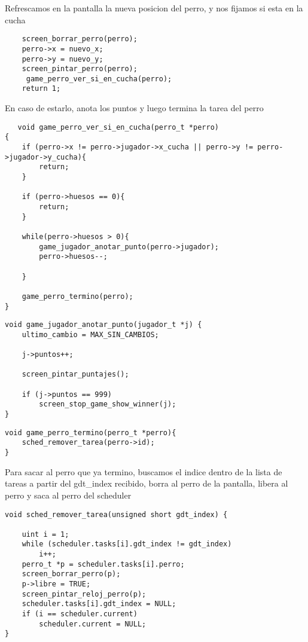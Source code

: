  Refrescamos en la pantalla la nueva posicion del perro, y nos fijamos si esta en la cucha
  \begin{codesnippet}
\begin{verbatim}
    screen_borrar_perro(perro);
    perro->x = nuevo_x;
    perro->y = nuevo_y;
    screen_pintar_perro(perro);
     game_perro_ver_si_en_cucha(perro);
    return 1;
       \end{verbatim}
\end{codesnippet}
   
En caso de estarlo, anota los puntos y luego termina la tarea del perro
  \begin{codesnippet}
\begin{verbatim}
   void game_perro_ver_si_en_cucha(perro_t *perro)
{
    if (perro->x != perro->jugador->x_cucha || perro->y != perro->jugador->y_cucha){
        return;
    }

    if (perro->huesos == 0){
        return;
    }

    while(perro->huesos > 0){
        game_jugador_anotar_punto(perro->jugador);
        perro->huesos--;

    }
  
    game_perro_termino(perro);
}
       \end{verbatim}
\end{codesnippet}
\begin{codesnippet}
\begin{verbatim}
void game_jugador_anotar_punto(jugador_t *j) {
    ultimo_cambio = MAX_SIN_CAMBIOS;

    j->puntos++;

    screen_pintar_puntajes();

    if (j->puntos == 999)
        screen_stop_game_show_winner(j);
}
 \end{verbatim}
\end{codesnippet}
\begin{codesnippet}
\begin{verbatim}
void game_perro_termino(perro_t *perro){
    sched_remover_tarea(perro->id);
}
 \end{verbatim}
\end{codesnippet}

Para sacar al perro que ya termino, buscamos el indice dentro de la lista de tareas a partir del gdt\_index recibido,
borra al perro de la pantalla, libera al perro y saca al perro del scheduler
\begin{codesnippet}
\begin{verbatim}
void sched_remover_tarea(unsigned short gdt_index) {

    uint i = 1;
    while (scheduler.tasks[i].gdt_index != gdt_index)
        i++;
    perro_t *p = scheduler.tasks[i].perro;
    screen_borrar_perro(p);
    p->libre = TRUE;
    screen_pintar_reloj_perro(p);
    scheduler.tasks[i].gdt_index = NULL;
    if (i == scheduler.current)
        scheduler.current = NULL;
}
 \end{verbatim}
\end{codesnippet}

